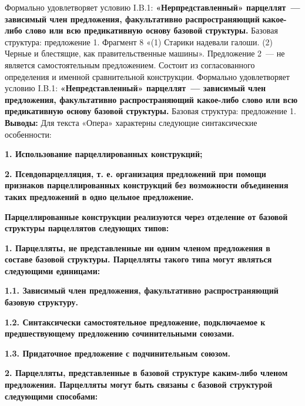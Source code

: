 \documentclass{kursa4}
\begin{document}
{     Формально удовлетворяет условию I.B.1: \textbf{«}\textbf{Нерпредставленный» парцеллят~--- зависимый член предложения, факультативно распространяющий }\textbf{какое-либо слово или всю предикативную основу базовой структуры. }Базовая структура: предложение 1. Фрагмент 8 «(1) Старики надевали галоши. (2) Черные и блестящие, как правительственные машины». Предложение 2~--- не является самостоятельным предложением. Состоит из согласованного определения и именной сравнительной конструкции. Формально удовлетворяет условию I.B.1: \textbf{«}\textbf{Непредставленный» парцеллят~--- зависимый член предложения, факультативно распространяющий какое-либо слово или всю предикативную основу базовой структуры.} Базовая структура: предложение 1. \textbf{Выводы:} \textmd{Для текста «Опера» характерны следующие синтаксические особенности:}

      {\bfseries\color[rgb]{0.2,0.2,0.2}
      \textmd{1. Использование парцеллированных конструкций;}}

      {\bfseries\color[rgb]{0.2,0.2,0.2}
      \textmd{2. Псевдопарцелляция, т. е. организация предложений при помощи признаков парцеллированных конструкций }\textmd{без возможности объединения таких предложений в одно цельное предложение.}}

      {\bfseries\color[rgb]{0.2,0.2,0.2}
      \textmd{}Парцеллированные конструкции\textmd{ }\textmd{реализуются через отделение от базовой структуры парцеллятов следующих типов}\textmd{:}}

      {\bfseries\color[rgb]{0.2,0.2,0.2}
      \textmd{}\textmd{1. Парцелляты, не представленные ни одним членом предложения в составе базовой структуры. Парцелляты такого типа могут являться следующими единицами:}}

      {\bfseries\color[rgb]{0.2,0.2,0.2}
      \textmd{1.1. Зависимый член предложения, факультативно распространяющий базовую структуру.}}

      {\bfseries\color[rgb]{0.2,0.2,0.2}
      \textmd{1.2. }\textmd{Синтаксически самостоятельное предложение, подключаемое к предшествующему предложению сочинительными союзами.}}

      {\bfseries\color[rgb]{0.2,0.2,0.2}
      \textmd{1.3. Придаточное предложение с подчинительным союзом.}}

      {\bfseries\color[rgb]{0.2,0.2,0.2}
      \textmd{2. Парцелляты, представленные в базовой структуре каким-либо членом предложения. Парцелляты могут быть связаны с базовой структурой следующими способами:}}

}
\end{document}
